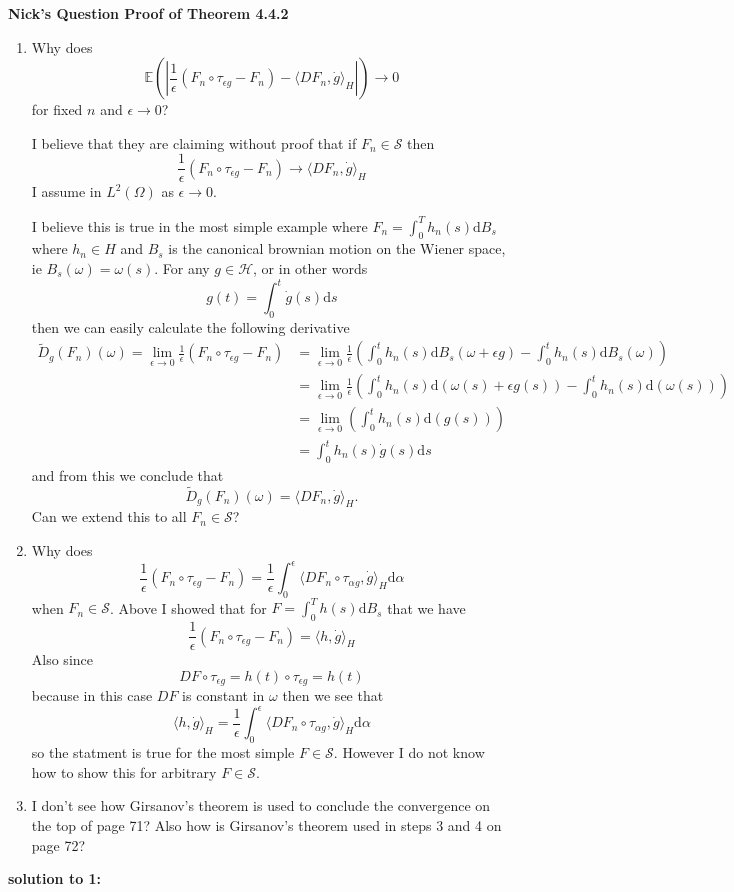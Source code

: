\documentclass[a4paper,11pt]{article}
\numberwithin{equation}{section}
\theoremstyle{plain}
\theoremstyle{definition}
\newcommand{\ud}{\ensuremath{\mathrm{d}}}
\newcounter{NQ}
\newenvironment{NickQuestion}[1][] %
{\refstepcounter{NQ}
	\begin{mdframed}[backgroundcolor=lightgray]\textbf{Nick's Question \theNQ \: #1~~}~~~\noindent}%
	{\end{mdframed}}
\numberwithin{NQ}{section}
\numberwithin{LQ}{section}
\numberwithin{ZQ}{section}
\begin{document}
\begin{NickQuestion}[Proof of Theorem 4.4.2]
\begin{enumerate}
\item	Why does 
	\[
		\mathbb{E}\left(\left|\frac{1}{\epsilon}(F_n\circ \tau_{\epsilon g}-F_n)-\langle DF_n,\dot{g} \rangle_H \right|\right) \to 0
	\]
for fixed $n$ and $\epsilon \to 0$? 

I believe that they are claiming without proof that if $F_n \in \mathcal S$ then 
\[
\dfrac{1}{\epsilon}(F_n\circ \tau_{\epsilon g} - F_n) \to \langle DF_n,\dot{g} \rangle_H
\]
 I assume in $L^2(\Omega)$ as $\epsilon \to 0$. 
 
 I believe this is true in the most simple example where $F_n=\int_0^Th_n(s)\ud B_s$ where $h_n \in H$ and $B_s$ is the canonical brownian motion on the Wiener space, ie $B_s(\omega)=\omega(s)$. For any $g \in \mathcal H$, or in other words 
 \[
 g(t) = \int_0^t \dot{g}(s)\ud s
 \]
then we can easily calculate the following derivative 
\begin{align*}
	\tilde{D}_{g}(F_n)(\omega) = \lim_{\epsilon \to 0} \frac{1}{\epsilon}(F_n \circ \tau_{\epsilon g}-F_n) &=  \lim_{\epsilon \to 0} \frac{1}{\epsilon}\left( \int_0^t h_n(s) \ud B_s(\omega + \epsilon g) - \int_0^t h_n(s) \ud B_s(\omega) \right) 
	\\&= \lim_{\epsilon \to 0} \frac{1}{\epsilon}\left( \int_0^t h_n(s) \ud (\omega(s) + \epsilon g(s)) - \int_0^t h_n(s) \ud (\omega(s)) \right)
	\\&=   \lim_{\epsilon \to 0} \left( \int_0^t h_n(s) \ud (g(s)) \right)
	\\& = \int_0^t h_n(s) \dot{g}(s)\ud s 
\end{align*}
and from this we conclude that 
\[
		\tilde{D}_{g}(F_n)(\omega) = \langle DF_n , \dot{g} \rangle_H.
\]
	Can we extend this to all $F_n \in \mathcal S$? 
\item Why does 
\[
	\dfrac{1}{\epsilon}(F_n\circ \tau_{\epsilon g}-F_n)=\frac{1}{\epsilon}\int_0^\epsilon \langle DF_n \circ \tau_{\alpha g}, \dot{g} \rangle_H \ud \alpha 
\]
when $F_n \in \mathcal S$. Above I showed that for $F=\int_0^Th(s) \ud B_s$ that we have 
\[
		\dfrac{1}{\epsilon}(F_n\circ \tau_{\epsilon g}-F_n)= \langle h, \dot{g} \rangle_H
\]
Also since 
\[
	DF \circ \tau_{\epsilon g} = h(t)\circ \tau_{\epsilon g} = h(t)
\]
because in this case $DF$ is constant in $\omega$ then we see that 
\[
\langle h, \dot{g} \rangle_H = \dfrac{1}{\epsilon}	\int_0^\epsilon \langle DF_n \circ \tau_{\alpha g}, \dot{g} \rangle_H \ud \alpha
\]
so the statment is true for the most simple $F \in \mathcal S$. However I do not know how to show this for arbitrary $F \in \mathcal S$. 

\item I don't see how Girsanov's theorem is used to conclude the convergence on the top of page 71? Also how is Girsanov's theorem used in steps 3 and 4 on page 72?
\end{enumerate}
\end{NickQuestion}
\textbf{solution to 1:}
\end{document}
